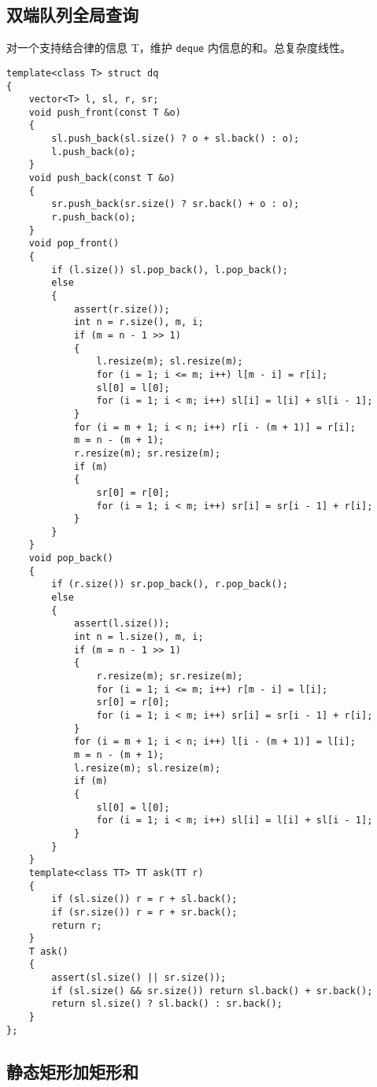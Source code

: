 \documentclass[12pt]{ctexart}
\begin{document}
\subsection{双端队列全局查询}

对一个支持结合律的信息 T，维护 \verb|deque| 内信息的和。总复杂度线性。

\begin{lstlisting}
template<class T> struct dq
{
	vector<T> l, sl, r, sr;
	void push_front(const T &o)
	{
		sl.push_back(sl.size() ? o + sl.back() : o);
		l.push_back(o);
	}
	void push_back(const T &o)
	{
		sr.push_back(sr.size() ? sr.back() + o : o);
		r.push_back(o);
	}
	void pop_front()
	{
		if (l.size()) sl.pop_back(), l.pop_back();
		else
		{
			assert(r.size());
			int n = r.size(), m, i;
			if (m = n - 1 >> 1)
			{
				l.resize(m); sl.resize(m);
				for (i = 1; i <= m; i++) l[m - i] = r[i];
				sl[0] = l[0];
				for (i = 1; i < m; i++) sl[i] = l[i] + sl[i - 1];
			}
			for (i = m + 1; i < n; i++) r[i - (m + 1)] = r[i];
			m = n - (m + 1);
			r.resize(m); sr.resize(m);
			if (m)
			{
				sr[0] = r[0];
				for (i = 1; i < m; i++) sr[i] = sr[i - 1] + r[i];
			}
		}
	}
	void pop_back()
	{
		if (r.size()) sr.pop_back(), r.pop_back();
		else
		{
			assert(l.size());
			int n = l.size(), m, i;
			if (m = n - 1 >> 1)
			{
				r.resize(m); sr.resize(m);
				for (i = 1; i <= m; i++) r[m - i] = l[i];
				sr[0] = r[0];
				for (i = 1; i < m; i++) sr[i] = sr[i - 1] + r[i];
			}
			for (i = m + 1; i < n; i++) l[i - (m + 1)] = l[i];
			m = n - (m + 1);
			l.resize(m); sl.resize(m);
			if (m)
			{
				sl[0] = l[0];
				for (i = 1; i < m; i++) sl[i] = l[i] + sl[i - 1];
			}
		}
	}
	template<class TT> TT ask(TT r)
	{
		if (sl.size()) r = r + sl.back();
		if (sr.size()) r = r + sr.back();
		return r;
	}
	T ask()
	{
		assert(sl.size() || sr.size());
		if (sl.size() && sr.size()) return sl.back() + sr.back();
		return sl.size() ? sl.back() : sr.back();
	}
};

\end{lstlisting}

\subsection{静态矩形加矩形和}
\end{document}
